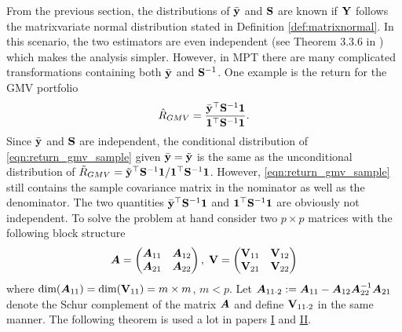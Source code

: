 \documentclass[12pt, twoside]{book}\usepackage{knitr}
\begin{document}
From the previous section, the distributions of $\bar{\mathbf{y}}$ and $\mathbf{S}$ are known if $\mathbf{Y}$ follows the matrixvariate normal distribution stated in Definition \ref{def:matrixnormal}. 
In this scenario, the two estimators are even independent (see Theorem 3.3.6 in \cite{GuptaNagar2000}) which makes the analysis simpler.
However, in MPT there are many complicated transformations containing both $\bar{\mathbf{y}}$ and $\mathbf{S}^{-1}$.
One example is the return for the GMV portfolio
\begin{equation}\label{eqn:return_gmv_sample}
\hat{R}_{GMV}=\frac{\bar{\mathbf{y}}^\top\mathbf{S}^{-1}\mathbf{1}}{\mathbf{1}^\top\mathbf{S}^{-1}\mathbf{1}}.
\end{equation}
Since $\bar{\mathbf{y}}$ and $\mathbf{S}$ are independent, the conditional distribution of \eqref{eqn:return_gmv_sample} given $\bar{\mathbf{y}}=\tilde{\mathbf{y}}$ is the same as the unconditional distribution of $\tilde{R}_{GMV} = \tilde{\mathbf{y}}^\top \mathbf{S}^{-1} \mathbf{1} / \mathbf{1}^\top \mathbf{S}^{-1} \mathbf{1}$.
However, \eqref{eqn:return_gmv_sample} still contains the sample covariance matrix in the nominator as well as the denominator.
The two quantities $\bar{\mathbf{y}}^\top\mathbf{S}^{-1}\mathbf{1}$ and $\mathbf{1}^\top\mathbf{S}^{-1}\mathbf{1}$ are obviously not independent.
To solve the problem at hand consider two $p\times p$ matrices with the following block structure 
\begin{equation}\label{eqn:blockmat}
\mbox{\boldmath$A$} = \begin{pmatrix}
       \mbox{\boldmath$A$}_{11} & \mbox{\boldmath$A$}_{12} \\
       \mbox{\boldmath$A$}_{21} & \mbox{\boldmath$A$}_{22}
      \end{pmatrix},\;
\mathbf{V} = \begin{pmatrix}
           \mathbf{V}_{11} & \mathbf{V}_{12} \\
           \mathbf{V}_{21} & \mathbf{V}_{22}
          \end{pmatrix}
\end{equation}
where $\text{dim}(\mbox{\boldmath$A$}_{11}) = \text{dim}(\mathbf{V}_{11})= m \times m$, $m<p$. 
Let $\mbox{\boldmath$A$}_{11\cdot 2} := \mbox{\boldmath$A$}_{11} - \mbox{\boldmath$A$}_{12} \mbox{\boldmath$A$}_{22}^{-1} \mbox{\boldmath$A$}_{21}$ denote the Schur complement of the matrix $\mbox{\boldmath$A$}$ and define $\mathbf{V}_{11\cdot 2}$ in the same manner. 
The following theorem is used a lot in papers \hyperref[sec:paper2]{I} and \hyperref[sec:paper2]{II}.
\end{document}
